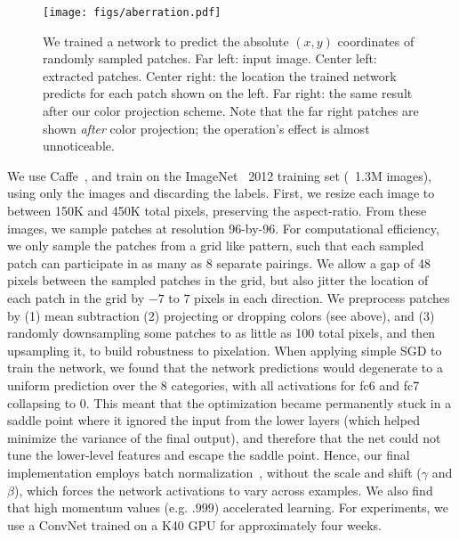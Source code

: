 \documentclass[10pt,twocolumn,letterpaper]{article}
\begin{document}
\begin{figure*}[t]
\begin{center}
   \texttt{[image: figs/aberration.pdf]}
\end{center}
    \vspace{-0.2in}
   \caption{
    We trained a network to predict the absolute $(x,y)$ coordinates of randomly sampled patches.
    Far left: input image. %
    Center left: extracted patches.
    Center right: the location the trained network predicts for each patch shown on the left.  Far right: the same result after our color projection scheme.  Note that the far right patches are shown \textit{after} color projection; the operation's effect is almost unnoticeable.
    }
    \vspace{-0.2in}
\label{fig:aberration}
\end{figure*}

 We use Caffe~\cite{jia2014caffe}, and train on the ImageNet~\cite{deng2009imagenet} 2012 training set (~1.3M images), using only the images and discarding the labels. First, we resize each image to between 150K and 450K total pixels, preserving the aspect-ratio. From these images, we sample patches at resolution 96-by-96. For computational efficiency, we only sample the patches from a grid like pattern, such that each sampled patch can participate in as many as 8 separate pairings. We allow a gap of 48 pixels between the sampled patches in the grid, but also jitter the location of each patch in the grid by $-7$ to $7$ pixels in each direction.
We preprocess patches by (1) mean subtraction
(2) projecting or dropping colors (see above), and (3) randomly downsampling some patches to as little as 100 total pixels, and then upsampling it, to build robustness to pixelation. When applying simple SGD to train the network, we found that the network predictions would degenerate to a uniform prediction over the 8 categories, with all activations for fc6 and fc7 collapsing to 0. This meant that the optimization became permanently stuck in a saddle point where it ignored the input from the lower layers (which helped minimize the variance of the final output), and therefore that the net could not tune the lower-level features and escape the saddle point.  Hence, our final implementation employs batch normalization~\cite{ioffe2015batch}, without the scale and shift ($\gamma$ and $\beta$), which forces the network activations to vary across examples.  We also find that high momentum values (e.g. $.999$) accelerated learning.  For experiments, we use a ConvNet trained on a K40 GPU for approximately four weeks.  
\end{document}
